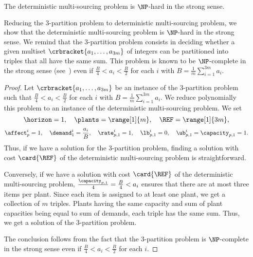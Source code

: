 \begin{thm}\label{thm:deterministic-multi-sourcing:strong-NP-hard}
The deterministic multi-sourcing problem is $\NP$-hard in the strong sense.
\end{thm}


Reducing the 3-partition problem to deterministic multi-sourcing problem, we show that the deterministic multi-sourcing problem is $\NP$-hard in the strong sense.
We remind that the 3-partition problem consists in deciding whether a given multiset $\crbracket{a_1,\ldots,a_{3m}}$ of integers can be partitioned into triples that all have the same sum.
This problem is known to be $\NP$-complete in the strong sense (see~\cite{Garey1979}) even if $\frac{B}{4} < a_i < \frac{B}{2}$ for each $i$ with $B=\frac{1}{m}\sum_{i=1}^{3m}a_i$.



\begin{proof}
Let $\crbracket{a_1,\ldots,a_{3m}}$ be an instance of the 3-partition problem such that $\frac{B}{4} < a_i < \frac{B}{2}$ for each $i$ with $B=\frac{1}{m}\sum_{i=1}^{3m}a_i$.
We reduce polynomially this problem to an instance of the deterministic multi-sourcing problem.
We set
$$
  \horizon=1
  ,\quad
  \plants=\range[1]{m}
  ,\quad
  \REF=\range[1]{3m},
$$
$$
  \affect_p^i=1
  ,\quad
  \demand_1^i=\frac{a_i}{B}
  ,\quad
  \rate_{p,1}^i=1
  ,\quad
  \lb_{p,1}^i=0
  ,\quad
  \ub_{p,1}^i=\capacity_{p,1}=1.
$$
Thus, if we have a solution for the 3-partition problem, finding a solution with cost $\card{\REF}$ of the deterministic multi-sourcing problem is straightforward.

Conversely, if we have a solution with cost $\card{\REF}$ of the deterministic multi-sourcing problem, $\frac{\capacity_{p,1}}{4}=\frac{B}{4} < a_i$ ensures that there are at most three items per plant.
Since each item is assigned to at least one plant, we get a collection of $m$ triples.
Plants having the same capacity and sum of plant capacities being equal to sum of demands, each triple has the same sum.
Thus, we get a solution of the 3-partition problem.

The conclusion follows from the fact that the 3-partition problem is $\NP$-complete in the strong sense even if $\frac{B}{4} < a_i < \frac{B}{2}$ for each $i$.
\end{proof}


